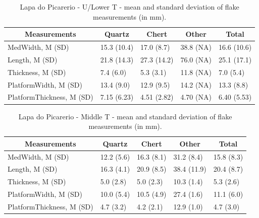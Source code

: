 \documentclass[12pt,twoside]{reedthesis}
\begin{document}
\newpage
\begin{table}[!h]

\caption{\label{tab:flakemetricsLP1}Lapa do Picarerio - U/Lower T - mean and standard deviation of flake measurements (in mm).}
\centering
\fontsize{9}{11}\selectfont
\begin{tabular}[t]{lllll}
\toprule
\multicolumn{1}{c}{\textbf{Measurements}} & \multicolumn{1}{c}{\textbf{Quartz}} & \multicolumn{1}{c}{\textbf{Chert}} & \multicolumn{1}{c}{\textbf{Other}} & \multicolumn{1}{c}{\textbf{Total}}\\
\midrule
MedWidth, M (SD) & 15.3 (10.4) & 17.0 (8.7) & 38.8 (NA) & 16.6 (10.6)\\
Length, M (SD) & 21.8 (14.3) & 27.3 (14.2) & 76.0 (NA) & 25.1 (17.1)\\
Thickness, M (SD) & 7.4 (6.0) & 5.3 (3.1) & 11.8 (NA) & 7.0 (5.4)\\
PlatformWidth, M (SD) & 13.4 (9.0) & 12.9 (9.5) & 14.2 (NA) & 13.3 (8.8)\\
PlatformThickness, M (SD) & 7.15 (6.23) & 4.51 (2.82) & 4.70 (NA) & 6.40 (5.53)\\
\bottomrule
\end{tabular}
\end{table}
\begin{table}[!h]

\caption{\label{tab:flakemetricsLP2}Lapa do Picarerio - Middle T - mean and standard deviation of flake measurements (in mm).}
\centering
\fontsize{9}{11}\selectfont
\begin{tabular}[t]{lllll}
\toprule
\multicolumn{1}{c}{\textbf{Measurements}} & \multicolumn{1}{c}{\textbf{Quartz}} & \multicolumn{1}{c}{\textbf{Chert}} & \multicolumn{1}{c}{\textbf{Other}} & \multicolumn{1}{c}{\textbf{Total}}\\
\midrule
MedWidth, M (SD) & 12.2 (5.6) & 16.3 (8.1) & 31.2 (8.4) & 15.8 (8.3)\\
Length, M (SD) & 16.3 (4.1) & 20.9 (8.5) & 38.4 (11.9) & 20.4 (8.7)\\
Thickness, M (SD) & 5.0 (2.8) & 5.0 (2.3) & 10.3 (1.4) & 5.3 (2.6)\\
PlatformWidth, M (SD) & 10.0 (5.4) & 10.5 (4.9) & 27.4 (1.6) & 11.1 (6.0)\\
PlatformThickness, M (SD) & 4.7 (3.2) & 4.2 (2.1) & 12.9 (1.0) & 4.7 (3.0)\\
\bottomrule
\end{tabular}
\end{table}
\newpage

\newpage
\end{document}
